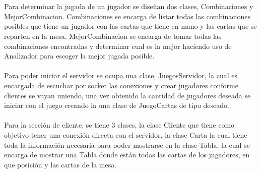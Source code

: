 \documentclass{article}
\begin{document}
\\\\
Para determinar la jugada de un jugador se diseñan dos clases, Combinaciones y MejorCombinacion. Combinaciones se encarga de listar todas las combinaciones posibles que tiene un jugador con las cartas que tiene en mano y las cartas que se reparten en la mesa. MejorCombinacion se encarga de tomar todas las combinaciones encontradas y determinar cual es la mejor haciendo uso de Analizador para escoger la mejor jugada posible.
\\\\
Para poder iniciar el servidor se ocupa una clase, JuegosServidor, la cual es encargada de escuchar por socket las conexiones y crear jugadores conforme clientes se vayan uniendo, una vez obtenido la cantidad de jugadores deseada se iniciar con el juego creando la una clase de JuegoCartas de tipo deseado.
\\\\
Para la sección de cliente, se tiene 3 clases, la clase Cliente que tiene como objetivo tener una conexión directa con el servidor, la clase Carta la cual tiene toda la información necesaria para poder mostrarse en la clase Tabla, la cual se encarga de mostrar una Tabla donde están todas las cartas de los jugadores, en que posición y las cartas de la mesa.
\newpage
\end{document}

